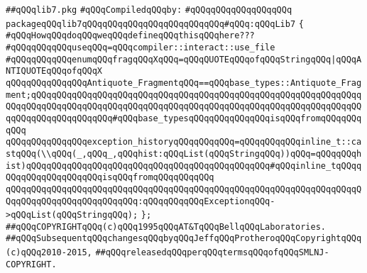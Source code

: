\label{src/lib/std/src/nj/lib7.pkg}
\verb|##qQQqlib7.pkg|\newline
\newline
\verb|#qQQqCompiledqQQqby:|\newline
\verb|#qQQqqQQqqQQqqQQqqQQq|\newline
\newline
\verb|packageqQQqlib7qQQqqQQqqQQqqQQqqQQqqQQqqQQq#qQQq:qQQqLib7|\newline
\verb|{|\newline
\newline
\verb|#qQQqHowqQQqdoqQQqweqQQqdefineqQQqthisqQQqhere???|\newline
\verb|#qQQqqQQqqQQquseqQQq=qQQqcompiler::interact::use_file|\newline
\newline
\newline
\verb|#qQQqqQQqqQQqenumqQQqfragqQQqXqQQq=qQQqQUOTEqQQqofqQQqStringqQQq|\verb#|qQQqANTIQUOTEqQQqofqQQqX#\newline
\newline
\verb|qQQqqQQqqQQqqQQqAntiquote_FragmentqQQq==qQQqbase_types::Antiquote_Fragment;qQQqqQQqqQQqqQQqqQQqqQQqqQQqqQQqqQQqqQQqqQQqqQQqqQQqqQQqqQQqqQQqqQQqqQQqqQQqqQQqqQQqqQQqqQQqqQQqqQQqqQQqqQQqqQQqqQQqqQQqqQQqqQQqqQQqqQQqqQQqqQQqqQQqqQQqqQQq#qQQqbase_typesqQQqqQQqqQQqqQQqisqQQqfromqQQqqQQqqQQq|\newline
\newline
\verb|qQQqqQQqqQQqqQQqexception_historyqQQqqQQqqQQq=qQQqqQQqqQQqinline_t::castqQQq(\\qQQq(_,qQQq_,qQQqhist:qQQqList(qQQqStringqQQq))qQQq=qQQqqQQqhist)qQQqqQQqqQQqqQQqqQQqqQQqqQQqqQQqqQQqqQQqqQQqqQQq#qQQqinline_tqQQqqQQqqQQqqQQqqQQqqQQqisqQQqfromqQQqqQQqqQQq|\newline
\verb|qQQqqQQqqQQqqQQqqQQqqQQqqQQqqQQqqQQqqQQqqQQqqQQqqQQqqQQqqQQqqQQqqQQqqQQqqQQqqQQqqQQqqQQqqQQqqQQq:qQQqqQQqqQQqExceptionqQQq->qQQqList(qQQqStringqQQq);|\newline
\verb|};|\newline
\newline
\newline
\newline
\verb|##qQQqCOPYRIGHTqQQq(c)qQQq1995qQQqAT&TqQQqBellqQQqLaboratories.|\newline
\verb|##qQQqSubsequentqQQqchangesqQQqbyqQQqJeffqQQqProtheroqQQqCopyrightqQQq(c)qQQq2010-2015,|\newline
\verb|##qQQqreleasedqQQqperqQQqtermsqQQqofqQQqSMLNJ-COPYRIGHT.|\newline

